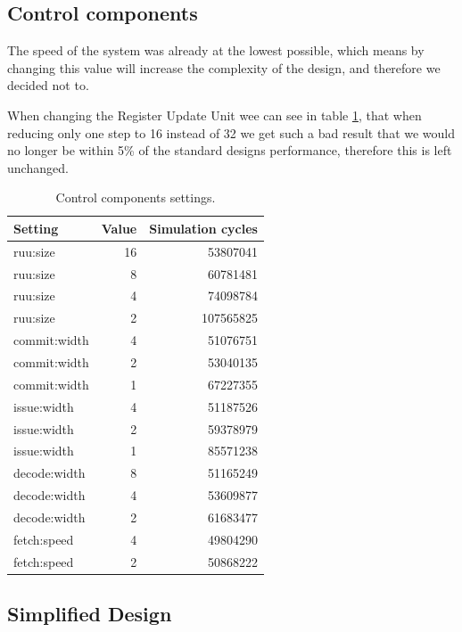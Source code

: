 \documentclass[titlepage, a4paper]{article}
\begin{document}
\subsection{Control components}
The speed of the system was already at the lowest possible, which means by changing this value will increase the complexity of the design, and therefore we decided not to.

When changing the Register Update Unit wee can see in table \ref{tab:control}, that when reducing only one step to 16 instead of 32 we get such a bad result that we would no longer be within 5\% of the standard designs performance, therefore this is left unchanged.

\begin{table}[H]
\centering
\caption{Control components settings.}

\begin{tabular}{|l|r|r|}
  \hline
  \textbf{Setting} & \textbf{Value} & \textbf{Simulation cycles}\\ \hline
  ruu:size & 16 & 53807041 \\ \hline
  ruu:size & 8 & 60781481 \\ \hline
  ruu:size & 4 & 74098784 \\ \hline
  ruu:size & 2 & 107565825 \\ \hline
  commit:width & 4 & 51076751 \\ \hline
  commit:width & 2 & 53040135 \\ \hline
  commit:width & 1 & 67227355 \\ \hline
  issue:width & 4 & 51187526 \\ \hline
  issue:width & 2 & 59378979 \\ \hline
  issue:width & 1 & 85571238 \\ \hline
  decode:width & 8 & 51165249 \\ \hline
  decode:width & 4 & 53609877 \\ \hline
  decode:width & 2 & 61683477 \\ \hline
  fetch:speed & 4 & 49804290 \\ \hline
  fetch:speed & 2 & 50868222 \\ \hline
\end{tabular}

\label{tab:control}
\end{table}

\subsection{Simplified Design}
\end{document}
